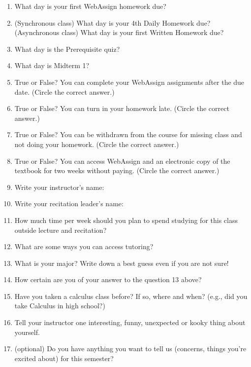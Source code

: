 \documentclass[12pt]{article}
\begin{document}
\begin{enumerate} 
\item What day is your first WebAssign homework due?
\vfill
\item (Synchronous class) What day is your 4th Daily Homework due? (Asynchronous class) What day is your first Written Homework due?
\vfill
\item What day is the Prerequisite quiz?
\vfill 
\item What day is Midterm 1? 
\vfill 
\item True or False? You can complete your WebAssign assignments after the due date. (Circle the correct answer.)
\vfill
\item  True or False? You can turn in your homework late. (Circle the correct answer.)
\vfill
\item  True or False? You can be withdrawn from the course for missing class and not doing your homework. (Circle the correct answer.)
\vfill
\item  True or False? You can access WebAssign and an electronic copy of the textbook for two weeks without paying. (Circle the correct answer.)
\vfill
\item Write your instructor's name: 
\vfill
\item Write your recitation leader's name: 
\vfill

\newpage

\item How much time per week should you plan to spend studying for this class outside lecture and recitation?
\vfill

\item What are some ways you can access tutoring?
\vfill
\item What is your major? Write down a best guess even if you are not sure!
\vfill
\item How certain are you of your answer to the question 13 above? 
\vfill

\item Have you taken a calculus class before? If so, where and when? (e.g., did you take Calculus in high school?)
\vfill
\item Tell your instructor one interesting, funny, unexpected or kooky thing about yourself.
\vfill
\item (optional) Do you have anything you want to tell us (concerns, things you're excited about) for this semester? 
\vspace{2in}
\end{enumerate}
\end{document}
